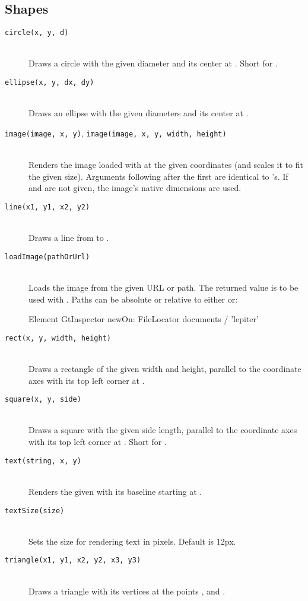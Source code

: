 \subsection{Shapes}
\begin{description}
\item[\texttt{circle(x, y, d)}] \hfill \\
	Draws a circle with the given diameter and its center at . Short for .
\item[\texttt{ellipse(x, y, dx, dy)}] \hfill \\
	Draws an ellipse with the given diameters and its center at .
\item[\texttt{image(image, x, y)}, \texttt{image(image, x, y, width, height)}] \hfill \\
	Renders the image loaded with  at the given coordinates (and scales it to fit the given size). Arguments following after the first are identical to 's. If  and  are not given, the image's native dimensions are used.
\item[\texttt{line(x1, y1, x2, y2)}] \hfill \\
	Draws a line from  to .
\item[\texttt{loadImage(pathOrUrl)}] \hfill \\
	Loads the image from the given URL or path. The returned value is to be used with .
Paths can be absolute or relative to either  or:
\begin{code}
Element
GtInspector newOn: FileLocator documents / 'lepiter'
\end{code}
\item[\texttt{rect(x, y, width, height)}] \hfill \\
	Draws a rectangle of the given width and height, parallel to the coordinate axes with its top left corner at .
\item[\texttt{square(x, y, side)}] \hfill \\
	Draws a square with the given side length, parallel to the coordinate axes with its top left corner at . Short for .
\item[\texttt{text(string, x, y)}] \hfill \\
	Renders the given  with its baseline starting at .
\item[\texttt{textSize(size)}] \hfill \\
	Sets the size for rendering text in pixels. Default is 12px.
\item[\texttt{triangle(x1, y1, x2, y2, x3, y3)}] \hfill \\
	Draws a triangle with its vertices at the points ,  and .
\end{description}


